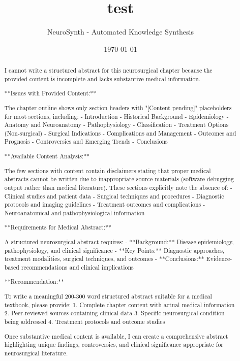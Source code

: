 \documentclass[12pt,a4paper]{article}
\title{test}
\author{NeuroSynth - Automated Knowledge Synthesis}
\date{\today}
\begin{document}
\maketitle


\begin{abstract}
I cannot write a structured abstract for this neurosurgical chapter because the provided content is incomplete and lacks substantive medical information.

**Issues with Provided Content:**

The chapter outline shows only section headers with "[Content pending]" placeholders for most sections, including:
- Introduction
- Historical Background  
- Epidemiology
- Anatomy and Neuroanatomy
- Pathophysiology
- Classification
- Treatment Options (Non-surgical)
- Surgical Indications
- Complications and Management
- Outcomes and Prognosis
- Controversies and Emerging Trends
- Conclusions

**Available Content Analysis:**

The few sections with content contain disclaimers stating that proper medical abstracts cannot be written due to inappropriate source materials (software debugging output rather than medical literature). These sections explicitly note the absence of:
- Clinical studies and patient data
- Surgical techniques and procedures
- Diagnostic protocols and imaging guidelines
- Treatment outcomes and complications
- Neuroanatomical and pathophysiological information

**Requirements for Medical Abstract:**

A structured neurosurgical abstract requires:
- **Background:** Disease epidemiology, pathophysiology, and clinical significance
- **Key Points:** Diagnostic approaches, treatment modalities, surgical techniques, and outcomes
- **Conclusions:** Evidence-based recommendations and clinical implications

**Recommendation:**

To write a meaningful 200-300 word structured abstract suitable for a medical textbook, please provide:
1. Complete chapter content with actual medical information
2. Peer-reviewed sources containing clinical data
3. Specific neurosurgical condition being addressed
4. Treatment protocols and outcome studies

Once substantive medical content is available, I can create a comprehensive abstract highlighting unique findings, controversies, and clinical significance appropriate for neurosurgical literature.
\end{abstract}
\end{document}
